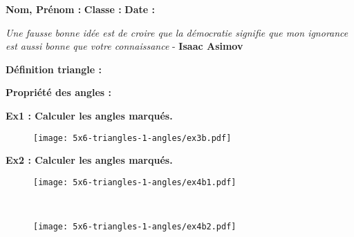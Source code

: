 \newpage

\textbf{Nom, Prénom :} \hspace{8cm} \textbf{Classe :} \hspace{3cm} \textbf{Date :}\\

\begin{center}
  \textit{Une fausse bonne idée est de croire que la démocratie signifie que mon ignorance est aussi bonne que votre connaissance}  - \textbf{Isaac Asimov}
\end{center}


\textbf{Définition triangle :} \\ \Pointilles[3]

\textbf{Propriété des angles :} \\ \Pointilles[3]

\textbf{Ex1 : Calculer les angles marqués.}

\begin{figure}[H]
  \centering
  \texttt{[image: 5x6-triangles-1-angles/ex3b.pdf]}
\end{figure}

\begin{multicols}{4}
\Pointilles[4] 
\columnbreak 

\Pointilles[4] 
\columnbreak 

\Pointilles[4] 
\columnbreak 

\Pointilles[4] 
\columnbreak 
\end{multicols}

\textbf{Ex2 : Calculer les angles marqués.}

\begin{minipage}[t]{0.4\textwidth}
  \begin{figure}[H]
    \centering
    \texttt{[image: 5x6-triangles-1-angles/ex4b1.pdf]}
  \end{figure}
\end{minipage}
\begin{minipage}[t]{0.6\textwidth}
  \Pointilles[11] \\
\end{minipage}

\begin{minipage}[t]{0.4\textwidth}
  \begin{figure}[H]
    \centering
    \texttt{[image: 5x6-triangles-1-angles/ex4b2.pdf]}
  \end{figure} 
\end{minipage}
\begin{minipage}[t]{0.6\textwidth}
  \Pointilles[11] \\
\end{minipage}



